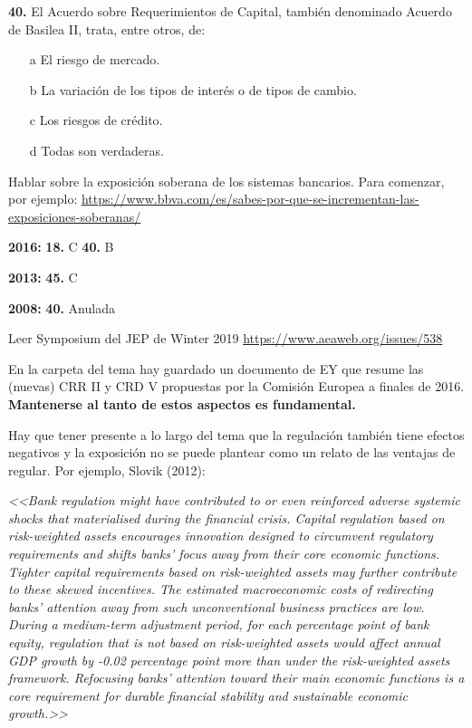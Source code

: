 \documentclass{nuevotema}
\begin{document}

\textbf{40.} El Acuerdo sobre Requerimientos de Capital, también denominado Acuerdo de Basilea II, trata, entre otros, de:

\begin{itemize}
	\item[a] El riesgo de mercado.
	\item[b] La variación de los tipos de interés o de tipos de cambio.
	\item[c] Los riesgos de crédito.
	\item[d] Todas son verdaderas.
\end{itemize}

\notas


Hablar sobre la exposición soberana de los sistemas bancarios. Para comenzar, por ejemplo: \url{https://www.bbva.com/es/sabes-por-que-se-incrementan-las-exposiciones-soberanas/}

\textbf{2016:} \textbf{18.} C \textbf{40.} B

\textbf{2013:} \textbf{45.} C

\textbf{2008:} \textbf{40.} Anulada

Leer Symposium del JEP de Winter 2019 \url{https://www.aeaweb.org/issues/538}


En la carpeta del tema hay guardado un documento de EY que resume las (nuevas) CRR II y CRD V propuestas por la Comisión Europea a finales de 2016. \textbf{Mantenerse al tanto de estos aspectos es fundamental.}

Hay que tener presente a lo largo del tema que la regulación también tiene efectos negativos y la exposición no se puede plantear como un relato de las ventajas de regular. Por ejemplo, Slovik (2012):

\textit{<<Bank regulation might have contributed to or even reinforced adverse systemic shocks that materialised during the financial crisis. Capital regulation based on risk-weighted assets encourages innovation designed to circumvent regulatory requirements and shifts banks’ focus away from their core economic functions. Tighter capital requirements based on risk-weighted assets may further contribute to these skewed incentives. The estimated macroeconomic costs of redirecting banks’ attention away from such unconventional business practices are low. During a medium-term adjustment period, for each percentage point of bank equity, regulation that is not based on risk-weighted assets would affect annual GDP growth by -0.02 percentage point more than under the risk-weighted assets framework. Refocusing banks’ attention toward their main economic functions is a core requirement for durable financial stability and sustainable economic growth.>>}
\end{document}
